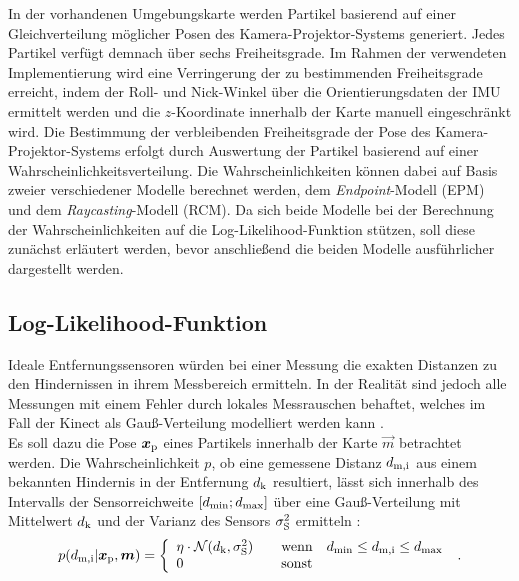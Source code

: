 In der vorhandenen Umgebungskarte werden Partikel basierend auf einer Gleichverteilung möglicher Posen des Kamera-Projektor-Systems generiert. Jedes Partikel verfügt demnach über sechs Freiheitsgrade. Im Rahmen der verwendeten Implementierung wird eine Verringerung der zu bestimmenden Freiheitsgrade erreicht, indem der Roll- und Nick-Winkel über die Orientierungsdaten der IMU ermittelt werden und die $z$-Koordinate innerhalb der Karte manuell eingeschränkt wird. Die Bestimmung der verbleibenden Freiheitsgrade der Pose des Kamera-Projektor-Systems erfolgt durch Auswertung der Partikel basierend auf einer Wahrscheinlichkeitsverteilung. Die Wahrscheinlichkeiten können dabei auf Basis zweier verschiedener Modelle berechnet werden, dem \textit{Endpoint}-Modell (EPM) und dem \textit{Raycasting}-Modell (RCM). Da sich beide Modelle bei der Berechnung der Wahrscheinlichkeiten auf die Log-Likelihood-Funktion stützen, soll diese zunächst erläutert werden, bevor anschließend die beiden Modelle ausführlicher dargestellt werden.
\prever{
}

\subsection{Log-Likelihood-Funktion}
\label{chap.loglik}
Ideale Entfernungssensoren würden bei einer Messung die exakten Distanzen zu den Hindernissen in ihrem Messbereich ermitteln. In der Realität sind jedoch alle Messungen mit einem Fehler durch lokales Messrauschen behaftet, welches im Fall der Kinect als Gauß-Verteilung modelliert werden kann \cite{Nguyen2012}.\\

Es soll dazu die Pose $\mbox{\boldmath{$x$}}_{{\mathrm{p}}}$ eines Partikels innerhalb der Karte $\vec{m}$ betrachtet werden. Die Wahrscheinlichkeit $p$, ob eine gemessene Distanz $d_{{\mathrm{m,i}}}$ aus einem bekannten Hindernis in der Entfernung $d_{{\mathrm{k}}}$ resultiert, lässt sich innerhalb des Intervalls der Sensorreichweite $[d_{{\mathrm{min}}};d_{{\mathrm{max}}}]$ über eine Gauß-Verteilung mit Mittelwert $d_{{\mathrm{k}}}$ und der Varianz des Sensors $\sigma_{{\mathrm{S}}}^2$ ermitteln \cite{Thrun2005}:
%
\begin{equation}
p(d_{{\mathrm{m,i}}}|\mbox{\boldmath{$x$}}_{{\mathrm{p}}},\mbox{\boldmath{$m$}}) = \left\lbrace\begin{array}{ll}
\eta  \cdot \mathcal{N}(d_{{\mathrm{k}}},\sigma_{{\mathrm{S}}}^2) & \quad \text{wenn} \quad d_{{\mathrm{min}}}\leq d_{{\mathrm{m,i}}} \leq d_{{\mathrm{max}}} \\
0 & \quad \text{sonst}
\end{array}
\right. \; \text{.}
\end{equation}

